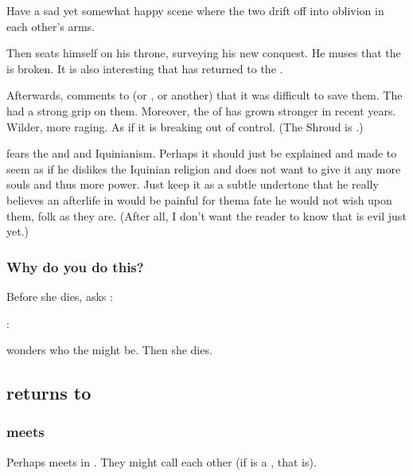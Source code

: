 Have a sad yet somewhat happy scene where the two drift off into oblivion in each other's arms. 

Then \Psyrex{} seats himself on his throne, surveying his new conquest. He muses that the \charade{} is broken. It is also interesting that \Ishnaruchaefir{} has returned to the \secretwar. 

Afterwards, \Psyrex{} comments to \Secherdamon{} (or \Nzessuacrith, or another) that it was difficult to save them. 
The \sephiroth{} had a strong grip on them. 
Moreover, the  of \Iquin{} has grown stronger in recent years. 
Wilder, more raging. 
As if it is breaking out of control. 
(The Shroud is .) 

\Psyrex{} fears the \sephiroth{} and \iquin{} and Iquinianism. 
Perhaps it should just be explained and made to seem as if he dislikes the Iquinian religion and does not want to give it any more souls and thus more power. 
Just keep it as a subtle undertone that he really believes an afterlife in \iquin{} would be painful for them\dash a fate he would not wish upon them, \honourable folk as they are. 
(After all, I don't want the reader to know that \Iquin{} is evil just yet.)





\subsubsection{Why do you do this?}
Before she dies, \Tiroco{} asks \Psyrex: 

\Psyrex: 

\Tiroco{} wonders who the \pps{\humans}  might be. Then she dies. 







\subsection[\Ishnaruchaefir returns to Malcur]{\Ishnaruchaefir returns to \Malcur}





\subsubsection{\Criseis meets \Psyrex}
Perhaps \Criseis meets \Psyrex in \Malcur.
They might call each other  (if \Psyrex is a \scatha, that is). 





